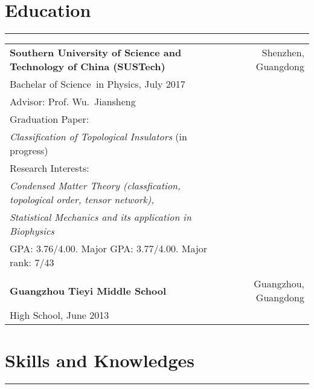 \documentclass[letterpaper]{article}
\begin{document}
\section*{Education}
\vspace{-8pt}
\hrule height .7pt
\smallskip
\begin{tabular*}{\textwidth}{l@{\extracolsep{\fill}}r}
{\bf\large Southern University of Science and Technology of China
    (SUSTech)} & Shenzhen, Guangdong\\
Bachelar of Science~in Physics, July 2017 \\
Advisor: Prof. Wu.~Jiansheng \\
Graduation Paper: \\
{\textit{Classification of Topological Insulators }(in
progress)}\\ 
Research Interests: \\
\textit{Condensed Matter Theory (classfication, topological order,
    tensor network), }\\
\textit{Statistical Mechanics and its application in
Biophysics}\\
GPA: 3.76/4.00. Major GPA: 3.77/4.00. Major rank: 7/43  \\

\\

{\bf\large Guangzhou Tieyi Middle School} & Guangzhou, Guangdong \\
High School, June 2013 \\

\end{tabular*}

\section*{Skills and Knowledges}
\vspace{-8pt}
\hrule height .7pt
$ $
\end{document}
